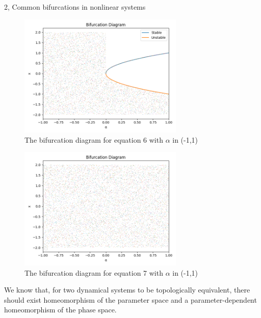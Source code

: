 \documentclass[10pt,a4paper]{article}
\begin{document}
\begin{task}{2, Common bifurcations in nonlinear systems}
     \begin{figure}[H]
        \centering
        \includegraphics[width=0.7\textwidth]{../plots/task2_1.png}
        \caption{The bifurcation diagram for equation 6 with $\alpha$ in (-1,1)}
        \label{fig:task2_1_bifurcation}
    \end{figure}    
    \begin{figure}[H]
        \centering
        \includegraphics[width=0.7\textwidth]{../plots/task2_2.png}
        \caption{The bifurcation diagram for equation 7 with $\alpha$ in (-1,1)}
        \label{fig:task2_2_bifurcation}
    \end{figure}
	
	We know that, for two dynamical systems to be topologically equivalent, there should exist homeomorphism of the parameter space and a parameter-dependent homeomorphism of the phase space.
	

\end{task}
\end{document}
